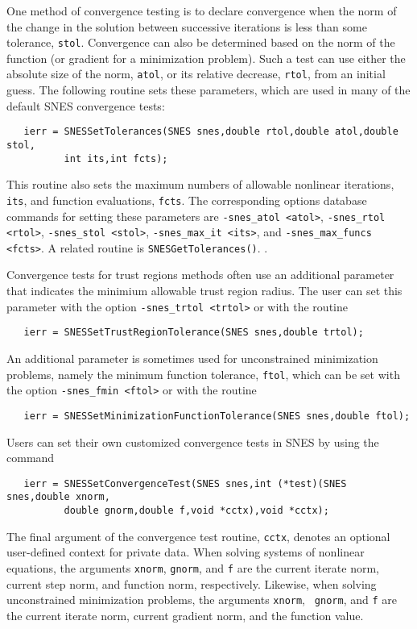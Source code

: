 One method of convergence testing is
to declare convergence when the norm of the change in the solution
between successive iterations is less than some tolerance, {\tt stol}.
Convergence can also be determined based on the norm of the function
(or gradient for a minimization problem).  
Such a test can use either the absolute size of the
norm, {\tt atol}, or its relative decrease, {\tt rtol}, from an initial
guess.  The following routine sets these parameters, which are used
in many of the default SNES convergence tests: 
\begin{verbatim}
   ierr = SNESSetTolerances(SNES snes,double rtol,double atol,double stol,
          int its,int fcts);
\end{verbatim}
This routine also sets the maximum numbers of allowable
nonlinear iterations, {\tt its}, and function evaluations, {\tt fcts}.
The corresponding options database commands for setting these parameters
are {\tt -snes\_atol <atol>}, {\tt -snes\_rtol <rtol>}, {\tt -snes\_stol <stol>},
   
 
{\tt -snes\_max\_it <its>}, and {\tt -snes\_max\_funcs <fcts>}.
A related routine is {\tt SNESGetTolerances()}. .

Convergence tests for trust regions methods often use an additional
parameter that indicates the minimium allowable trust region radius.
The user can set this parameter with the option {\tt -snes\_trtol <trtol>}
 or with the routine
\begin{verbatim}
   ierr = SNESSetTrustRegionTolerance(SNES snes,double trtol);
\end{verbatim}
An additional parameter is sometimes used for unconstrained minimization
problems, namely the minimum function tolerance, {\tt ftol}, which can
be set with the option {\tt -snes\_fmin <ftol>}  or
with the routine
\begin{verbatim}
   ierr = SNESSetMinimizationFunctionTolerance(SNES snes,double ftol);
\end{verbatim}

Users can set their own customized convergence tests in SNES by using
the command 
\begin{verbatim}
   ierr = SNESSetConvergenceTest(SNES snes,int (*test)(SNES snes,double xnorm,
          double gnorm,double f,void *cctx),void *cctx);
\end{verbatim}
The final argument of the convergence test routine, {\tt cctx},
denotes an optional user-defined context for private data.  When
solving systems of nonlinear equations, the arguments {\tt xnorm},
{\tt gnorm}, and {\tt f} are the current iterate norm, current step
norm, and function norm, respectively.  Likewise, when solving
unconstrained minimization problems, the arguments {\tt xnorm}, {\tt
gnorm}, and {\tt f} are the current iterate norm, current gradient
norm, and the function value.


